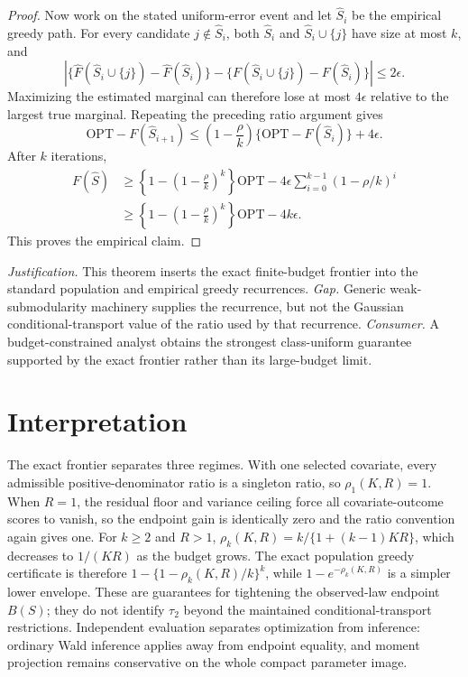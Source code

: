 \documentclass{article}
\begin{document}
\begin{proof}
Now work on the stated uniform-error event and let \(\widehat S_i\) be the empirical greedy path.  For every candidate \(j\notin\widehat S_i\), both \(\widehat S_i\) and \(\widehat S_i\cup\{j\}\) have size at most \(k\), and
\[
 \left|\{\widehat F(\widehat S_i\cup\{j\})-\widehat F(\widehat S_i)\}
 -\{F(\widehat S_i\cup\{j\})-F(\widehat S_i)\}\right|\le2\epsilon.
\]
Maximizing the estimated marginal can therefore lose at most \(4\epsilon\) relative to the largest true marginal.  Repeating the preceding ratio argument gives
\[
 \mathrm{OPT}-F(\widehat S_{i+1})
 \le\left(1-\frac\rho k\right)
 \{\mathrm{OPT}-F(\widehat S_i)\}+4\epsilon.
\]
After \(k\) iterations,
\[
\begin{aligned}
 F(\widehat S)
 &\ge\left\{1-\left(1-\frac\rho k\right)^k\right\}\mathrm{OPT}
 -4\epsilon\sum_{i=0}^{k-1}(1-\rho/k)^i\\
 &\ge\left\{1-\left(1-\frac\rho k\right)^k\right\}\mathrm{OPT}-4k\epsilon.
\end{aligned}
\]
This proves the empirical claim.
\end{proof}
\par\smallskip\noindent \textit{Justification.} This theorem inserts the exact finite-budget frontier into the standard population and empirical greedy recurrences. \textit{Gap.} Generic weak-submodularity machinery supplies the recurrence, but not the Gaussian conditional-transport value of the ratio used by that recurrence. \textit{Consumer.} A budget-constrained analyst obtains the strongest class-uniform guarantee supported by the exact frontier rather than its large-budget limit.

\section{Interpretation}

The exact frontier separates three regimes. With one selected covariate, every admissible positive-denominator ratio is a singleton ratio, so \(\rho_1(K,R)=1\). When \(R=1\), the residual floor and variance ceiling force all covariate-outcome scores to vanish, so the endpoint gain is identically zero and the ratio convention again gives one. For \(k\ge2\) and \(R>1\), \(\rho_k(K,R)=k/\{1+(k-1)KR\}\), which decreases to \(1/(KR)\) as the budget grows. The exact population greedy certificate is therefore \(1-\{1-\rho_k(K,R)/k\}^k\), while \(1-e^{-\rho_k(K,R)}\) is a simpler lower envelope. These are guarantees for tightening the observed-law endpoint \(B(S)\); they do not identify \(\tau_2\) beyond the maintained conditional-transport restrictions. Independent evaluation separates optimization from inference: ordinary Wald inference applies away from endpoint equality, and moment projection remains conservative on the whole compact parameter image.
\end{document}
